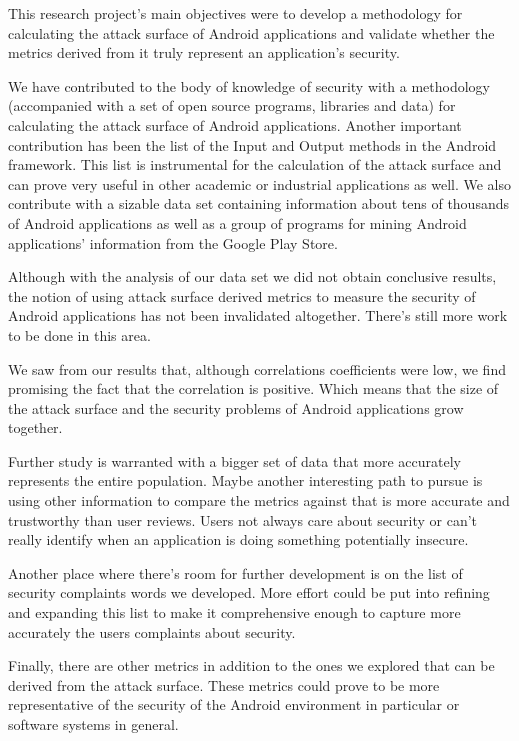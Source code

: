 \documentclass{sig-alternate}
\begin{document}
This research project's main objectives were to develop a methodology for calculating the attack surface of Android applications and validate whether the metrics derived from it truly represent an application's security.

We have contributed to the body of knowledge of security with a methodology (accompanied with a set of open source programs, libraries and data) for calculating the attack surface of Android applications. Another important contribution has been the list of the Input and Output methods in the Android framework. This list is instrumental for the calculation of the attack surface and can prove very useful in other academic or industrial applications as well. We also contribute with a sizable data set containing information about tens of thousands of Android applications as well as a group of programs for mining Android applications' information from the Google Play Store.

Although with the analysis of our data set we did not obtain conclusive results, the notion of using attack surface derived metrics to measure the security of Android applications has not been invalidated altogether. There's still more work to be done in this area.

We saw from our results that, although correlations coefficients were low, we find promising the fact that the correlation is positive. Which means that the size of the attack surface and the security problems of Android applications grow together.

Further study is warranted with a bigger set of data that more accurately represents the entire population. Maybe another interesting path to pursue is using other information to compare the metrics against that is more accurate and trustworthy than user reviews. Users not always care about security or can't really identify when an application is doing something potentially insecure. 

Another place where there's room for further development is on the list of security complaints words we developed. More effort could be put into refining and expanding this list to make it comprehensive enough to capture more accurately the users complaints about security.

Finally, there are other metrics in addition to the ones we explored that can be derived from the attack surface. These metrics could prove to be more representative of the security of the Android environment in particular or software systems in general.
\end{document}
